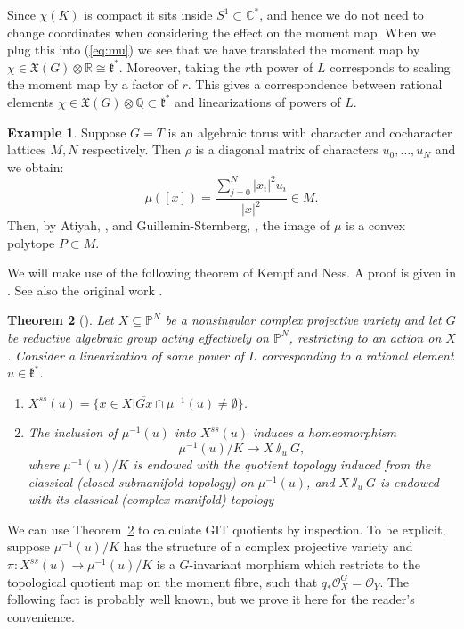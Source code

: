 \documentclass{amsart}
\newtheorem{theorem}{Theorem}[section]
\theoremstyle{definition}
\newtheorem{example}[theorem]{Example}
\newcommand{\CC}{\mathbb{C}}
\newcommand{\RR}{\mathbb{R}}
\newcommand{\QQ}{\mathbb{Q}}
\newcommand{\PP}{\mathbb{P}}
\begin{document}
Since \(\chi(K)\) is compact it sits inside \(S^1 \subset \CC^*\), and hence we do not need to change coordinates when considering the effect on the moment map. When we plug this into (\ref{eq:mu}) we see that we have translated the moment map by \(\chi \in \mathfrak{X}(G) \otimes \RR \cong \mathfrak{k}^*\). Moreover, taking the \(r\)th power of \(L\) corresponds to scaling the moment map by a factor of \(r\). This gives a correspondence between rational elements \(\chi \in \mathfrak{X}(G) \otimes \QQ \subset \mathfrak{k}^*\) and linearizations of powers of \(L\).
\begin{example}
Suppose \(G = T\) is an algebraic torus with character and cocharacter lattices \(M,N\) respectively. Then \(\rho\) is a diagonal matrix of characters \(u_0,\dots,u_{N}\) and we obtain:
\[
\mu([x]) = \frac{\sum_{j=0}^N |x_i|^2 u_i}{|x|^2} \in M.
\]
Then, by Atiyah, \cite{atiyah1982convexity}, and Guillemin-Sternberg, \cite{guillemin1982convexity}, the image of \(\mu\) is a convex polytope \(P \subset M\).
\end{example}
%
%
%
We will make use of the following theorem of Kempf and Ness. A proof is given in \cite[Chapter 8]{mumford1994}. See also the original work \cite{kempf1979}.
\begin{theorem}[{\cite[Theorem 8.3]{kempf1979}}]\label{thm:KN}
Let \(X \subseteq \PP^N\) be a nonsingular complex projective variety and let \(G\) be reductive algebraic group acting effectively on \(\PP^N\), restricting to an action on \(X\). Consider a linearization of some power of \(L\) corresponding to a rational element \(u \in \mathfrak{k}^*\).
\begin{enumerate}
\item \(X^{ss}(u) = \{ x \in X | \overline{Gx} \cap \mu^{-1}(u) \neq \emptyset \} \). \\
\item The inclusion of \(\mu^{-1}(u)\) into \(X^{ss}(u)\) induces a homeomorphism
\[
\mu^{-1}(u)/K \to X\sslash_u G,
\]
where \(\mu^{-1}(u)/K\) is endowed with the quotient topology induced from the classical (closed submanifold topology) on \(\mu^{-1}(u)\), and \(X \sslash_u G\) is endowed with its classical (complex manifold) topology
\end{enumerate}
\end{theorem}
%
%
%
We can use Theorem~\ref{thm:KN} to calculate GIT quotients by inspection. To be explicit, suppose \(\mu^{-1}(u)/K\) has the structure of a complex projective variety and \(\pi: X^{ss}(u) \to \mu^{-1}(u)/K\) is a \(G\)-invariant morphism which restricts to the topological quotient map on the moment fibre, such that \(q_* \mathcal{O}_X^G = \mathcal{O}_Y\). The following fact is probably well known, but we prove it here for the reader's convenience.
\end{document}
